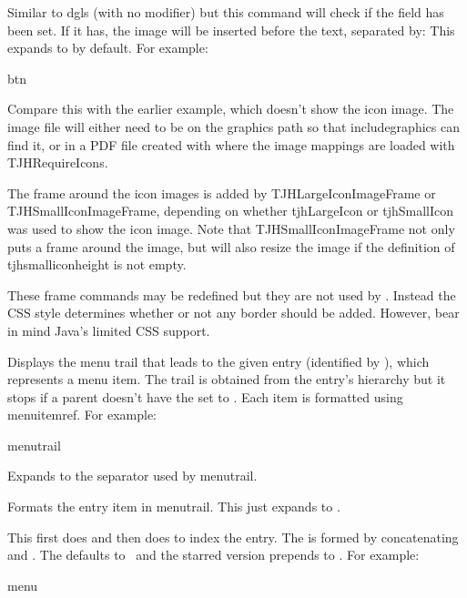 \documentclass[toc=listof]{scrreport}
\newcommand{\glsoptval}[2]{\optval{gls.#1}{#2}}
\begin{document}
Similar to \gls{dgls} (with no modifier) but this command will check
if the  field has been set. If it has, 
the image will be inserted before the text, separated by:
This expands to  by default. For example:
\begin{coderesult}
\gls{btn}
\tcblower
{}
\end{coderesult}
Compare this with the earlier 
example, which doesn't show the icon image. The image file will
either need to be on the graphics path so that \gls{includegraphics} can find
it, or in a PDF file created with  where the
image mappings are loaded with \gls{TJHRequireIcons}.

The frame around the icon images is added by \gls{TJHLargeIconImageFrame}
or \gls{TJHSmallIconImageFrame}, depending on whether
\gls{tjhLargeIcon} or \gls{tjhSmallIcon} was used to show the icon
image. Note that \gls{TJHSmallIconImageFrame} not only puts a frame
around the image, but will also resize the image if the definition of
\gls{tjhsmalliconheight} is not empty.

These frame commands may be redefined but they are not used by .
Instead the CSS style determines whether or not any border should be
added. However, bear in mind Java's limited CSS support.

Displays the menu trail that leads to the given entry (identified by
), which represents a menu item. The trail is 
obtained from the entry's hierarchy but it stops if a parent doesn't
have the  set to . Each item is
formatted using \gls{menuitemref}.
For example:
\begin{coderesult}
\gls{menutrail}
\tcblower
{}
\end{coderesult}

Expands to the separator used by \gls{menutrail}.

Formats the entry item in \gls{menutrail}. This just expands to
.

This first does  and
then does  
to index the entry. The 
is formed by concatenating  and .
The  defaults to \ and
the starred version prepends \glsoptval{format}{\glscsname{glsignore}} to
.
For example:
\begin{coderesult}
\gls{menu}
\tcblower
{}
\end{coderesult}
\end{document}
